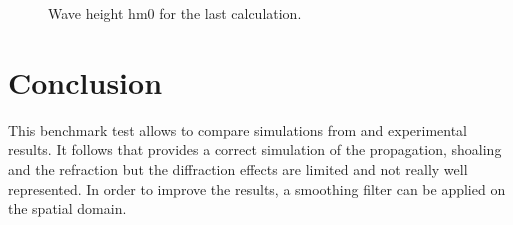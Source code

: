 \begin{figure}[H]
  \centering
      \caption{Wave height hm0 for the last calculation.}
\label{resultshoal}
\end{figure}

\section{Conclusion}
This benchmark test allows to compare simulations from \tomawac and experimental
results. It follows that \tomawac provides a correct simulation of the
propagation, shoaling and the refraction but the diffraction effects are
limited and not really well represented. In order to improve the results, a
smoothing filter can be applied on the spatial domain.
